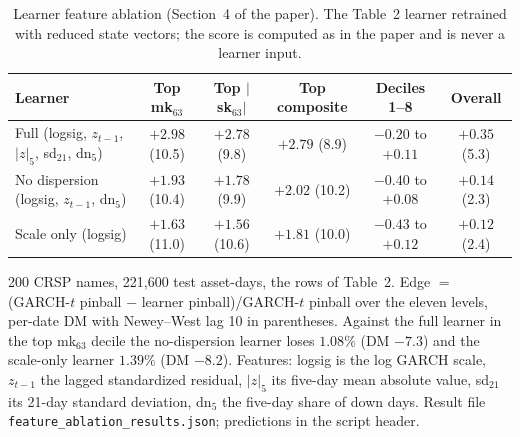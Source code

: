 \documentclass[11pt]{article}
\begin{document}
\begin{table}[htbp]
\centering
\begin{threeparttable}
\caption{Learner feature ablation (Section~4 of the paper). The Table~2 learner retrained with reduced state vectors; the score is computed as in the paper and is never a learner input.}
\label{tab:ablation}
\scriptsize\setlength{\tabcolsep}{3pt}
\begin{tabular}{lccccc}
\toprule
Learner & Top mk$_{63}$ & Top $|$sk$_{63}|$ & Top composite & Deciles 1--8 & Overall \\
\midrule
Full (logsig, $z_{t-1}$, $|z|_5$, sd$_{21}$, dn$_5$) & $+2.98$ (10.5) & $+2.78$ (9.8) & $+2.79$ (8.9) & $-0.20$ to $+0.11$ & $+0.35$ (5.3) \\
No dispersion (logsig, $z_{t-1}$, dn$_5$) & $+1.93$ (10.4) & $+1.78$ (9.9) & $+2.02$ (10.2) & $-0.40$ to $+0.08$ & $+0.14$ (2.3) \\
Scale only (logsig) & $+1.63$ (11.0) & $+1.56$ (10.6) & $+1.81$ (10.0) & $-0.43$ to $+0.12$ & $+0.12$ (2.4) \\
\bottomrule
\end{tabular}
\begin{tablenotes}\footnotesize
\item 200 CRSP names, 221,600 test asset-days, the rows of Table~2. Edge $=$ (GARCH-$t$ pinball $-$ learner pinball)/GARCH-$t$ pinball over the eleven levels, per-date DM with Newey--West lag 10 in parentheses. Against the full learner in the top mk$_{63}$ decile the no-dispersion learner loses $1.08\%$ (DM $-7.3$) and the scale-only learner $1.39\%$ (DM $-8.2$). Features: logsig is the log GARCH scale, $z_{t-1}$ the lagged standardized residual, $|z|_5$ its five-day mean absolute value, sd$_{21}$ its 21-day standard deviation, dn$_5$ the five-day share of down days. Result file \texttt{feature\_ablation\_results.json}; predictions in the script header.
\end{tablenotes}
\end{threeparttable}
\end{table}
\end{document}
